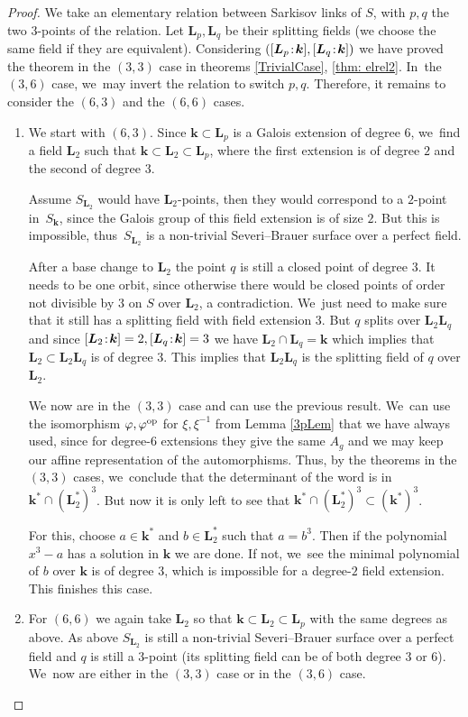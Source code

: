 \documentclass[JEP,XML,SOM,Unicode,NoFloatCountersInSection, NoEqCountersInSection,published]{cedram}
\newcommand{\op}{\textup{op}}
\newcommand{\sep}{\mkern2mu{:}\mkern2mu}
\theoremstyle{definition}
\newcommand{\kk}{{\boldsymbol{k}}}
\newcommand{\LL}{{\boldsymbol{L}}}
\begin{document}
\begin{proof}
We take an elementary relation between Sarkisov links of $S$, with $p,q$ the two $3$\nobreakdash-points of the relation. Let $\LL_p, \LL_q$ be their splitting fields (we choose the same field if they are equivalent). Considering $([\LL_p\sep \kk], [\LL_q\sep \kk])$ we have proved the theorem in the $(3,3)$ case in theorems \ref{TrivialCase}, \ref{thm: elrel2}. In~the $(3,6)$ case, we~may invert the relation to switch $p,q$. Therefore, it remains to consider the $(6,3)$ and the $(6,6)$ cases.
\begin{enumerate}
\item We start with $(6,3)$. Since $\kk \subset \LL_p$ is a Galois extension of degree $6$, we~find a field $\LL_2$ such that $\kk \subset \LL_2 \subset \LL_p$, where the first extension is of degree $2$ and the second of degree $3$.

Assume $S_{\LL_2}$ would have $\LL_2$-points, then they would correspond to a $2$-point in~$S_{\kk}$, since the Galois group of this field extension is of size $2$. But this is impossible, thus~$S_{\LL_2}$ is a non-trivial Severi--Brauer surface over a perfect field.

After a base change to $\LL_2$ the point $q$ is still a closed point of degree $3$. It needs to be one orbit, since otherwise there would be closed points of order not divisible by $3$ on $S$ over $\LL_2$, a contradiction. We~just need to make sure that it still has a splitting field with field extension $3$. But $q$ splits over $\LL_2 \LL_q$ and since $[\LL_2\sep  \kk] = 2, [\LL_q\sep  \kk] = 3$ we have $\LL_2 \cap \LL_q = \kk$ which implies that $\LL_2 \subset \LL_2 \LL_q$ is of degree $3$. This implies that $\LL_2\LL_q$ is the splitting field of $q$ over $\LL_2$.

We now are in the $(3,3)$ case and can use the previous result. We~can use the isomorphism $\varphi, \varphi^{\op}$ for $\xi,\xi^{-1}$ from Lemma \ref{3pLem} that we have always used, since for degree-$6$ extensions they give the same $A_g$ and we may keep our affine representation of the automorphisms. Thus, by the theorems in the $(3,3)$ cases, we~conclude that the determinant of the word is in $\kk^* \cap (\LL_2^{*})^3$. But now it is only left to see that \hbox{$\kk^* \cap (\LL_2^{*})^3 \subset (\kk^{*})^3$}.

For this, choose $a \in \kk^*$ and $b \in \LL_2^*$ such that $a = b^3$. Then if the polynomial $x^3 - a$ has a solution in $\kk$ we are done. If not, we~see the minimal polynomial of $b$ over $\kk$ is of degree $3$, which is impossible for a degree-$2$ field extension. This finishes this case.
\item For $(6,6)$ we again take $\LL_2$ so that $\kk \subset \LL_2 \subset \LL_p$ with the same degrees as above. As above $S_{\LL_2}$ is still a non-trivial Severi--Brauer surface over a perfect field and $q$ is still a $3$\nobreakdash-point (its splitting field can be of both degree $3$ or $6$). We~now are either in the $(3,3)$ case or in the $(3,6)$ case.


\end{enumerate}
\end{proof}
\end{document}

